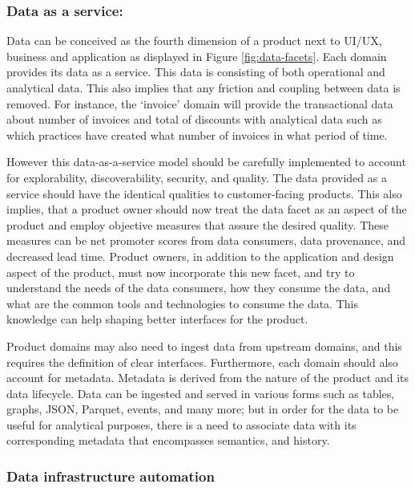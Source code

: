 \documentclass[review]{elsarticle}
\begin{document}
\subsubsection{Data as a service:}

Data can be conceived as the fourth dimension of a product next to UI/UX, business and application as displayed in Figure \ref{fig:data-facets}. Each domain provides its data as a service. This data is consisting of both operational and analytical data. This also implies that any friction and coupling between data is removed. For instance, the `invoice' domain will provide the transactional data about number of invoices and total of discounts with analytical data such as which practices have created what number of invoices in what period of time.


However this data-as-a-service model should be carefully implemented to account for explorability, discoverability, security, and quality. The data provided as a service should have the identical qualities to customer-facing products. This also implies, that a product owner should now treat the data facet as an aspect of the product and employ objective measures that assure the desired quality. These measures can be net promoter scores from data consumers, data provenance, and decreased lead time. Product owners, in addition to the application and design aspect of the product, must now incorporate this new facet, and try to understand the needs of the data consumers, how they consume the data, and what are the common tools and technologies to consume the data. This knowledge can help shaping better interfaces for the product.

Product domains may also need to ingest data from upstream domains, and this requires the definition of clear interfaces. Furthermore, each domain should also account for metadata. Metadata is derived from the nature of the product and its data lifecycle. Data can be ingested and served in various forms such as tables, graphs, JSON, Parquet, events, and many more; but in order for the data to be useful for analytical purposes, there is a need to associate data with its corresponding metadata that encompasses semantics, and history.

\subsubsection{Data infrastructure automation}
\end{document}
